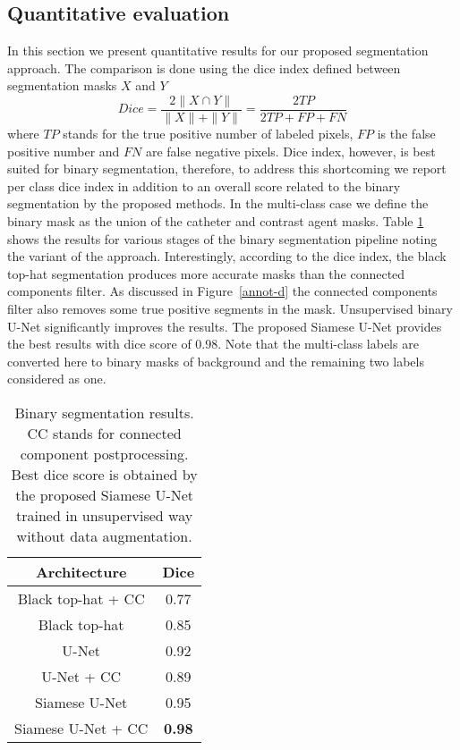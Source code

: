 \documentclass{bmvc2k}
\begin{document}
\subsection{Quantitative evaluation}\label{QUANT}
In this section we present quantitative results for our proposed segmentation approach. The comparison is done using the dice index defined between segmentation masks $X$ and $Y$
\begin{equation}
Dice=\frac{2\|X\cap Y\|}{\|X\| + \|Y\|}=\frac{2TP}{2TP+FP+FN}
\end{equation}
where $TP$ stands for the true positive number of labeled pixels, $FP$ is the false positive number and $FN$ are false negative pixels.  Dice index, however, is best suited for binary segmentation, therefore, to address this shortcoming we report per class dice index in addition to an overall score related to the binary segmentation by the proposed methods. In the multi-class case we define the binary mask as the union of the catheter and contrast agent masks. Table \ref{Quant_results_1}  shows the results for various stages of the binary segmentation pipeline noting the variant of the approach. 
Interestingly, according to the dice index, the black top-hat segmentation produces more accurate masks than the connected components filter. As discussed in Figure~\ref{annot-d} the connected components filter also removes some true positive segments in the mask.  Unsupervised binary U-Net significantly improves the results. %
The proposed Siamese U-Net provides the best results with dice score of 0.98. Note that the multi-class labels are converted here to binary masks of background and the remaining two labels considered as one. 
\begin{table}[h]
\begin{tabular}{|c|c|}
	\hline
	\textbf{Architecture} & \textbf{Dice} \\
	\hline\hline
	Black top-hat + CC & 0.77\\
	\hline
	Black top-hat & 0.85\\
	\hline
	U-Net & 0.92\\
	\hline
	U-Net + CC  & 0.89\\
	\hline
	Siamese U-Net & 0.95\\
	\hline
	Siamese U-Net + CC  & {\bf 0.98}\\
	\hline
\end{tabular}
\caption{Binary segmentation results. CC stands for connected component postprocessing. Best dice score is obtained by the proposed Siamese U-Net trained in unsupervised way without data augmentation.}
\label{Quant_results_1}
\end{table}
\end{document}
